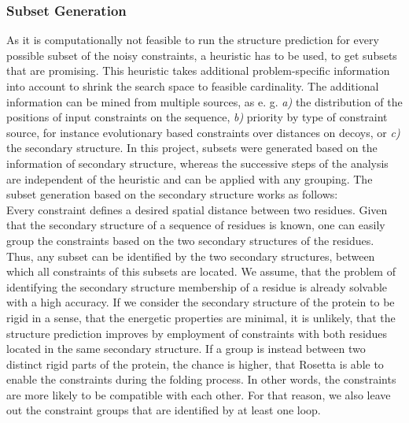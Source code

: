 \documentclass[a4paper, 11pt, parskip=half]{scrartcl}
\begin{document}
\subsubsection*{Subset Generation}
As it is computationally not feasible to run the structure prediction for every possible subset of the noisy constraints,
a heuristic has to be used, to get subsets that are promising.
This heuristic takes additional problem-specific information into account to shrink the search space to feasible cardinality.
The additional information can be mined from multiple sources, as e. g. 
\emph{a)} the distribution of the positions of input constraints on the sequence,
\emph{b)} priority by type of constraint source, for instance evolutionary based constraints over distances on decoys, or
\emph{c)} the secondary structure.
In this project, subsets were generated based on the information of secondary structure, whereas the successive steps of the analysis are independent of the heuristic and can be applied with any grouping. The subset generation based on the secondary structure works as follows:\\
Every constraint defines a desired spatial distance between two residues.
Given that the secondary structure of a sequence of residues is known, one can easily group the constraints based on the two secondary structures of the residues.
Thus, any subset can be identified by the two secondary structures, between which all constraints of this subsets are located.
We assume, that the problem of identifying the secondary structure membership of a residue is already solvable with a high accuracy. 
If we consider the secondary structure of the protein to be rigid in a sense, that the energetic properties are minimal, it is unlikely, that the structure prediction improves by employment of constraints with both residues located in the same secondary structure. 
If a group is instead between two distinct rigid parts of the protein, the chance is higher, that Rosetta is able to enable the constraints during the folding process. 
In other words, the constraints are more likely to be compatible with each other. 
For that reason, we also leave out the constraint groups that are identified by at least one loop.

\end{document}
